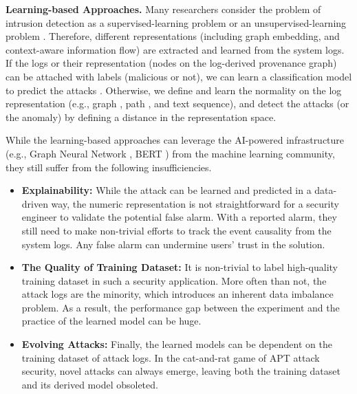 \noindent\textbf{Learning-based Approaches.}
Many researchers consider the problem of intrusion detection as a supervised-learning problem \cite{liu2018towards,hassan2019nodoze,hassan2020we} or an unsupervised-learning problem \cite{wang2022threatrace,han2020unicorn,wang2020you}.
Therefore, different representations \cite{zeng2021watson, zengy2022shadewatcher} (including graph embedding, and context-aware information flow) are extracted and learned from the system logs.
If the logs or their representation (nodes on the log-derived provenance graph) can be attached with labels (malicious or not),
we can learn a classification model to predict the attacks \cite{wang2022threatrace,han2020unicorn,wang2020you}.
Otherwise, we define and learn the normality on the log representation (e.g., graph \cite{manzoor2016fast,han2020unicorn,li2021hierarchical,yang2023prographer,cheng2023kairos}, path \cite{wang2020you,alsaheel2021atlas}, and text sequence), and detect the attacks (or the anomaly) by
defining a distance in the representation space.

While the learning-based approaches can leverage 
the AI-powered infrastructure (e.g., Graph Neural Network \cite{zhou2020graph,wu2020comprehensive}, BERT \cite{tenney2019bert}) from the machine learning community,
they still suffer from the following insufficiencies.

\begin{itemize}[leftmargin=*]
  \item \textbf{Explainability:}
    While the attack can be learned and predicted in a data-driven way,
    the numeric representation is not straightforward for a security engineer to 
    validate the potential false alarm.
    With a reported alarm, they still need to make non-trivial efforts to 
    track the event causality from the system logs.
    Any false alarm can undermine users' trust in the solution.
  \item \textbf{The Quality of Training Dataset:}
    It is non-trivial to label high-quality training dataset in such a security application.
    More often than not, the attack logs are the minority, which introduces an inherent data imbalance problem.
    As a result, the performance gap between the experiment and the practice of the learned model can be huge.
  \item \textbf{Evolving Attacks:}
    Finally, the learned models can be dependent on the training dataset of attack logs.
    In the cat-and-rat game of APT attack security,
    novel attacks can always emerge, 
    leaving both the training dataset and its derived model obsoleted.
\end{itemize}


